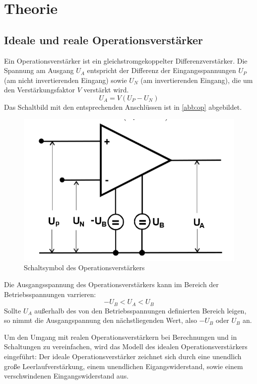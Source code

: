 \section{Theorie}

\subsection{Ideale und reale Operationsverst{\"a}rker}
Ein Operationsverstärker ist ein gleichstromgekoppelter Differenzverstärker. Die Spannung am Ausgang $U_A$ entspricht der Differenz der Eingangsspannungen $U_P$ (am nicht invertierenden Eingang)
sowie $U_N$ (am invertierenden Eingang), die um den Verstärkungsfaktor $V$ verstärkt wird.
\begin{equation}
U_A = V (U_P - U_N)
\end{equation}
Das Schaltbild mit den entsprechenden Anschlüssen ist in \autoref{abb:op} abgebildet.
\begin{figure}[h!]
 	\centering
 	\includegraphics[width=\textwidth]{img/op.png}
 	\caption{Schaltsymbol des Operationsverstärkers \cite{FP}}
 	\label{abb:op}
\end{figure}
Die Ausgangsspannung des Operationsverstärkers kann im Bereich der Betriebsspannungen varrieren:
\begin{equation}
-U_B < U_A < U_B
\end{equation}
Sollte $U_A$ außerhalb des von den Betriebsspannungen definierten Bereich leigen, so nimmt die Ausgangspannung den nächstliegenden Wert, also $-U_B$ oder $U_B$ an.

Um den Umgang mit realen Operationsverstärkern bei Berechnungen und in Schaltungen zu vereinfachen, wird das Modell des idealen Operationsverstärkers eingeführt:
Der ideale Operationsverstärker zeichnet sich durch eine unendlich große Leerlaufverstärkung, einem unendlichen Eigangswiderstand, sowie einem verschwindenen Eingangswiderstand aus.


